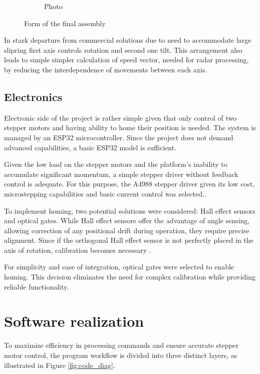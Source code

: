 \begin{figure}[h!]
\begin{subfigure}[b]{0.45\textwidth}
    \caption{Photo}
  \end{subfigure}
  \caption{Form of the final assembly}
  \label{fig:side_by_side}
\end{figure}

In stark departure from commercial solutions \cite{carl,standa} due to need to accommodate large slipring first axis controls rotation and second one tilt.
This arrangement also leads to simple simpler calculation of speed vector, needed for radar processing, by reducing the interdependence of movements between each axis.


\section{Electronics}

Electronic side of the project is rather simple given that only control of two stepper motors and having ability to home their position is needed.
The system is managed by an ESP32 microcontroller. Since the project does not demand advanced capabilities, a basic ESP32 model is sufficient.

Given the low load on the stepper motors and the platform's inability to accumulate significant momentum, a simple stepper driver without feedback control is adequate.
For this purpose, the A4988 stepper driver given its low cost, microstepping capabilities and basic current control\cite{a4988} was selected..

To implement homing, two potential solutions were considered: Hall effect sensors and optical gates.
While Hall effect sensors offer the advantage of angle sensing, allowing correction of any positional drift during operation, they require precise alignment.
Since if the orthogonal Hall effect sensor is not perfectly placed in the axis of rotation, calibration becomes necessary \cite{hall}.

For simplicity and ease of integration, optical gates were selected to enable homing.
This decision eliminates the need for complex calibration while providing reliable functionality.


\chapter{Software realization}

To maximize efficiency in processing commands and ensure accurate stepper motor control, the program workflow is divided into three distinct layers, as illustrated in Figure \ref{fig:code_diag}.

